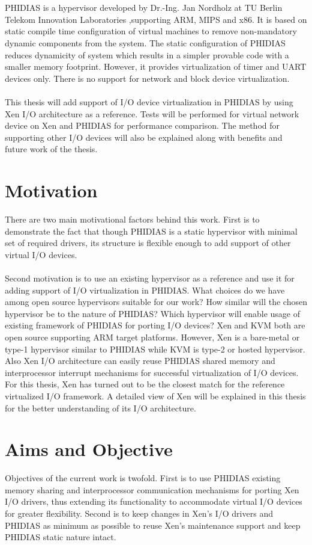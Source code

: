 \\
\\
PHIDIAS is a hypervisor developed by Dr.-Ing. Jan Nordholz at TU Berlin Telekom Innovation Laboratories \cite{Jan},supporting ARM, MIPS and x86. It is based on static compile time configuration of virtual machines to remove non-mandatory dynamic components from the system. The static configuration of PHIDIAS reduces dynamicity of system which results in a simpler provable code with a smaller memory footprint. However, it provides virtualization of  timer and UART devices only. There is no support for network and block device virtualization.
\\
\\
This thesis will add support of I/O device virtualization in PHIDIAS by using Xen I/O architecture as a reference. Tests will be performed for virtual network device on Xen and PHIDIAS for performance comparison. The method for supporting other I/O devices will also be explained along with benefits and future work of the thesis.

\section{Motivation\label{sec:moti}}
There are two main motivational factors behind this work. First is to demonstrate the fact that though PHIDIAS is a static hypervisor with minimal set of required drivers, its structure is flexible enough to add support of other virtual I/O devices. \\
\\
Second motivation is to use an existing hypervisor as a reference and use it for adding support of I/O virtualization in PHIDIAS. What choices do we have among open source hypervisors suitable for our work? How similar will the chosen hypervisor be to the nature of PHIDIAS? Which hypervisor will enable usage of existing framework of PHIDIAS for porting I/O devices? Xen and KVM both are open source supporting ARM target platforms. However, Xen is a bare-metal or type-1 hypervisor similar to PHIDIAS while KVM is type-2 or hosted hypervisor. Also Xen I/O architecture can easily reuse PHIDIAS shared memory and interprocessor interrupt mechanisms for successful virtualization of I/O devices. For this thesis, Xen has turned out to be the closest match for the reference virtualized I/O framework. A detailed view of Xen will be explained in this thesis for the better understanding of its I/O architecture.

\section{Aims and Objective\label{sec:objective}}
Objectives of the current work is twofold. First is to use PHIDIAS existing memory sharing and interprocessor communication mechanisms for porting Xen I/O drivers, thus extending its functionality to accommodate virtual I/O devices for greater flexibility. Second is to keep changes in Xen's I/O drivers and PHIDIAS as minimum as possible to reuse Xen's maintenance support and keep PHIDIAS static nature intact.


